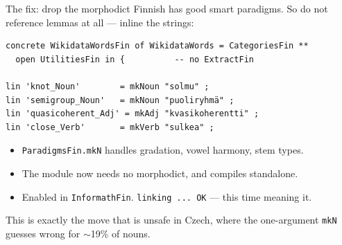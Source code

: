 \documentclass[10pt,aspectratio=169]{beamer}
\newcommand{\bad}[1]{\textcolor{warn}{#1}}
\newcommand{\ok}[1]{\textcolor{good}{#1}}
\begin{document}
\begin{frame}[fragile]{The fix: drop the morphodict}
  Finnish has good smart paradigms. So do not reference lemmas at all ---
  inline the strings:

\begin{lstlisting}
concrete WikidataWordsFin of WikidataWords = CategoriesFin **
  open UtilitiesFin in {          -- no ExtractFin

lin 'knot_Noun'        = mkNoun "solmu" ;
lin 'semigroup_Noun'   = mkNoun "puoliryhmä" ;
lin 'quasicoherent_Adj' = mkAdj "kvasikoherentti" ;
lin 'close_Verb'       = mkVerb "sulkea" ;
\end{lstlisting}

  \vspace{0.5em}
  \begin{itemize}
    \item \texttt{ParadigmsFin.mkN} handles gradation, vowel harmony, stem types.
    \item The module now needs no morphodict, and compiles standalone.
    \item \ok{Enabled in \texttt{InformathFin}.} \texttt{linking ... OK} --- this time meaning it.
  \end{itemize}

  \vspace{0.3em}
  \small This is exactly the move that is \bad{unsafe in Czech}, where the
  one-argument \texttt{mkN} guesses wrong for $\sim$19\% of nouns.
\end{frame}
\end{document}
